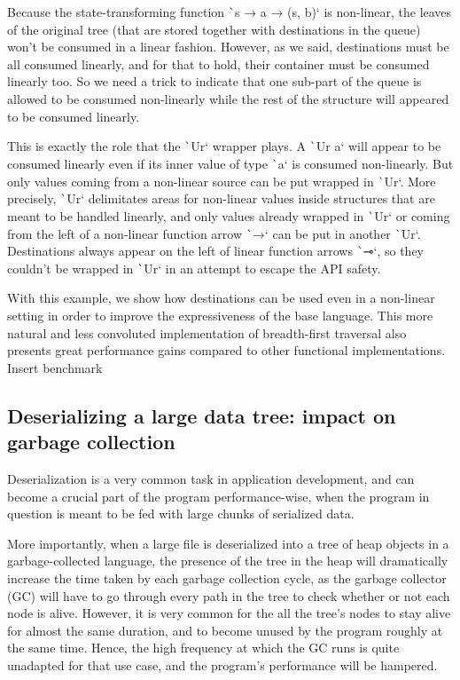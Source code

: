 \documentclass[english]{jflart}
\newcommand{\TODO}[1]{{\color{red}\large #1}}
\begin{document}
Because the state-transforming function \texttt`s → a → (s, b)` is non-linear, the leaves of the original tree (that are stored together with destinations in the queue) won't be consumed in a linear fashion. However, as we said, destinations must be all consumed linearly, and for that to hold, their container must be consumed linearly too. So we need a trick to indicate that one sub-part of the queue is allowed to be consumed non-linearly while the rest of the structure will appeared to be consumed linearly.

This is exactly the role that the \texttt`Ur` wrapper plays. A \texttt`Ur a` will appear to be consumed linearly even if its inner value of type \texttt`a` is consumed non-linearly. But only values coming from a non-linear source can be put wrapped in \texttt`Ur`. More precisely, \texttt`Ur` delimitates areas for non-linear values inside structures that are meant to be handled linearly, and only values already wrapped in \texttt`Ur` or coming from the left of a non-linear function arrow \texttt`→` can be put in another \texttt`Ur`. Destinations always appear on the left of linear function arrows \texttt`⊸`, so they couldn't be wrapped in \texttt`Ur` in an attempt to escape the API safety.

With this example, we show how destinations can be used even in a non-linear setting in order to improve the expressiveness of the base language. This more natural and less convoluted implementation of breadth-first traversal also presents great performance gains compared to other functional implementations. \TODO{Insert benchmark}

\subsection{Deserializing a large data tree: impact on garbage collection}\label{ssec:parser-sexpr}

Deserialization is a very common task in application development, and can become a crucial part of the program performance-wise, when the program in question is meant to be fed with large chunks of serialized data.

More importantly, when a large file is deserialized into a tree of heap objects in a garbage-collected language, the presence of the tree in the heap will dramatically increase the time taken by each garbage collection cycle, as the garbage collector (GC) will have to go through every path in the tree to check whether or not each node is alive. However, it is very common for the all the tree's nodes to stay alive for almost the same duration, and to become unused by the program roughly at the same time. Hence, the high frequency at which the GC runs is quite unadapted for that use case, and the program's performance will be hampered.
\end{document}
